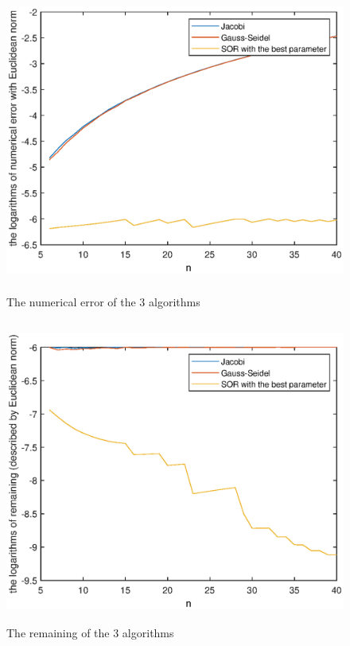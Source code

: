 \documentclass[UTF8,a4paper,10pt]{ctexart}
\begin{document}
\begin{figure}[ht]
    \centering
    \includegraphics[width=14cm,height=10cm]{2.3_error.eps}
    \caption{The numerical error of the 3 algorithms}
\end{figure}
\begin{figure}[ht]
    \centering
    \includegraphics[width=14cm,height=10cm]{2.3_remaining.eps}
    \caption{The remaining of the 3 algorithms}
\end{figure}
\end{document}
